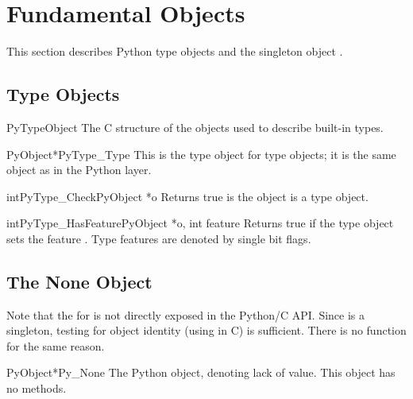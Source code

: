 \documentclass{manual}
\begin{document}
\section{Fundamental Objects \label{fundamental}}

This section describes Python type objects and the singleton object 
.


\subsection{Type Objects \label{typeObjects}}

\begin{ctypedesc}{PyTypeObject}
The C structure of the objects used to describe built-in types.
\end{ctypedesc}

\begin{cvardesc}{PyObject*}{PyType_Type}
This is the type object for type objects; it is the same object as
 in the Python layer.
\end{cvardesc}

\begin{cfuncdesc}{int}{PyType_Check}{PyObject *o}
Returns true is the object  is a type object.
\end{cfuncdesc}

\begin{cfuncdesc}{int}{PyType_HasFeature}{PyObject *o, int feature}
Returns true if the type object  sets the feature
.  Type features are denoted by single bit flags.
\end{cfuncdesc}


\subsection{The None Object \label{noneObject}}

Note that the  for  is not directly
exposed in the Python/C API.  Since  is a singleton,
testing for object identity (using \samp{==} in C) is sufficient.
There is no  function for the same reason.

\begin{cvardesc}{PyObject*}{Py_None}
The Python  object, denoting lack of value.  This object has
no methods.
\end{cvardesc}
\end{document}

